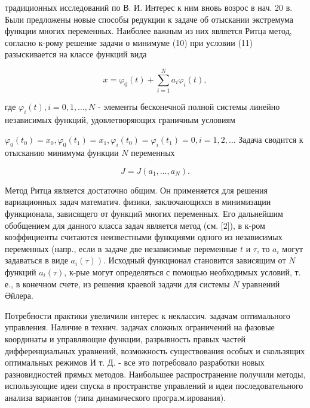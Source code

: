 \documentclass[10pt]{article}
\begin{document}
традиционных исследований по В. И. Интерес к ним вновь возрос в нач. 20 в. Были предложены новые способы редукции к задаче об отыскании экстремума функции многих переменных. Наиболее важным из них является Ритца метод, согласно к-рому решение задачи о минимуме (10) при условии (11) разыскивается на классе функций вида



\[

x=\varphi_{0}(t)+\sum_{i=1}^{N} a_{i} \varphi_{i}(t),

\]



где $\varphi_{i}(t), i=0,1, \ldots, N$ - элементы бесконечной полной системы линейно независимых функций, удовлетворяющих граничным условиям



$\varphi_{0}\left(t_{0}\right)=x_{0}, \varphi_{0}\left(t_{1}\right)=x_{1}, \varphi_{i}\left(t_{0}\right)=\varphi_{i}\left(t_{1}\right)=0, i=1,2, \ldots$ Задача сводится к отысканию минимума функции $N$ переменных



\[

J=J\left(a_{1}, \ldots, a_{N}\right) .

\]



Метод Ритца является достаточно общим. Он применяется для решения вариационных задач математич. физики, заключающихся в минимизации функционала, зависящего от функций многих переменных. Его дальнейшим обобщением для данного класса задач является метод (см. [2]), в к-ром коэффициенты считаются неизвестными функциями одного из независимых переменных (напр., если в задаче две независимые переменные $t$ и $\tau$, то $a_{i}$ могут задаваться в виде $\left.a_{i}(\tau)\right)$. Исходный функционал становится зависящим от $N$ функций $a_{i}(\tau)$, к-рые могут определяться с помощью необходимых условий, т. е., в конечном счете, из решения краевой задачи для системы $N$ уравнений Әйлера.



Потребности практики увеличили интерес к неклассич. задачам оптимального управления. Наличие в технич. задачах сложных ограничений на фазовые координаты и управляющие функции, разрывность правых частей дифференциальных уравнений, возможность существования особых и скользящих оптимальных режимов И т. Д. - все это потребовало разработки новых разновидностей прямых методов. Наибольшее распространение получили методы, использующие идеи спуска в пространстве управлений и идеи последовательного анализа вариантов (типа динамического програ.м.ирования).
\end{document}
